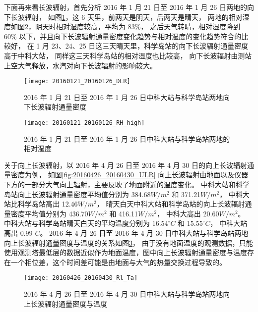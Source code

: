 下面再来看长波辐射，首先分析 2016 年 1 月 21 日至 2016 年 1 月 26 日两地的向下长波辐射，
如图\ref{fig:20160121_20160126_DLR}，这 6 天里，前两天是阴天，后两天是晴天，
两地的相对湿度如图\ref{fig:20160121_20160126_RH_high}，阴天时相对湿度较高，平均为 83\%，
之后天气转晴，相对湿度降到 60\% 以下，并且向下长波辐射通量密度变化趋势与相对湿度的变化趋势符合的比较好，
在 1 月 23、24、25 日这三天晴天里，科学岛站的向下长波辐射通量密度高于中科大站，
同样这三天科学岛站的相对湿度也比较高，
向下长波辐射由测站上空大气释放，水汽对向下长波辐射的影响较大。
\begin{figure}[H]
\centering
\texttt{[image: 20160121\_20160126\_DLR]}
\caption{2016 年 1 月 21 日至 2016 年 1 月 26 日中科大站与科学岛站两地向下长波辐射通量密度}\label{fig:20160121_20160126_DLR}
\end{figure}
\begin{figure}[H]
\centering
\texttt{[image: 20160121\_20160126\_RH\_high]}
\caption{2016 年 1 月 21 日至 2016 年 1 月 26 日中科大站与科学岛站两地的相对湿度}\label{fig:20160121_20160126_RH_high}
\end{figure}

关于向上长波辐射，以 2016 年 4 月 26 日至 2016 年 4 月 30 日的向上长波辐射通量密度为例，
如图\ref{fig:20160426_20160430_ULR}
向上长波辐射由地面以及仪器下方的一部分大气向上辐射，主要反映了地面附近的温度变化。
中科大站和科学岛站向上长波辐射通量密度平均值分别为 384.68\(W/m^2\) 和 371.21\(W/m^2\)，
中科大站比科学岛站高出 12.46\(W/m^2\)，
晴天白天中科大站和科学岛站的向上长波辐射通量密度平均值分别为 436.70\(W/m^2\) 和 416.11\(W/m^2\)，
中科大高出 20.60\(W/m^2\)。
中科大站与科学岛站晴天白天的平均温度分别为 \(16.54^{\circ}C\) 和 \(15.55^{\circ}C\)，
中科大站高出 \(0.99^{\circ}C\)。
2016 年 4 月 26 日至 2016 年 4 月 30 日中科大站与科学岛站两地向上长波辐射通量密度与温度的关系如图\ref{fig:20160426_20160430_Rl_Ta}，
由于没有地面温度的观测数据，只能使用观测塔最低层的数据近似作为地面温度，图中向上长波辐射通量密度与温度存在一个相位差，这个时间差可能是由地面与大气的热量交换过程导致的。
\begin{figure}[H]
\centering
\texttt{[image: 20160426\_20160430\_Rl\_Ta]}
\caption{2016 年 4 月 26 日至 2016 年 4 月 30 日中科大站与科学岛站两地向上长波辐射通量密度与温度}\label{fig:20160426_20160430_Rl_Ta}
\end{figure}

